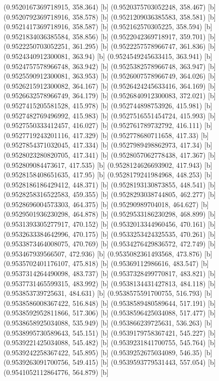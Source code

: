 {{{(0.9520167369718915, 358.364) [b] 
(0.9520375703052248, 358.467) [b] 
(0.9520792369718916, 358.578) [b] 
(0.9521209036385583, 358.581) [b] 
(0.9521417369718916, 358.587) [b] 
(0.952162570305225, 358.594) [b] 
(0.9521834036385584, 358.856) [b] 
(0.9522042369718917, 359.701) [b] 
(0.9522250703052251, 361.295) [b] 
(0.9522257578966747, 361.836) [b] 
(0.9524340912300081, 363.94) [b] 
(0.9524549245633415, 363.941) [b] 
(0.9524757578966748, 363.942) [b] 
(0.9525382578966748, 363.947) [b] 
(0.9525590912300081, 363.953) [b] 
(0.9526007578966749, 364.026) [b] 
(0.9526215912300082, 364.167) [b] 
(0.9526424245633416, 364.169) [b] 
(0.9526632578966749, 364.179) [b] 
(0.9526840912300083, 372.021) [b] 
(0.9527415205581528, 415.978) [b] 
(0.952744898753926, 415.981) [b] 
(0.9527482769496992, 415.983) [b] 
(0.9527516551454724, 415.993) [b] 
(0.9527550333412457, 416.027) [b] 
(0.952761789732792, 416.111) [b] 
(0.9527719243201116, 417.329) [b] 
(0.952778680711658, 417.33) [b] 
(0.9527854371032045, 417.334) [b] 
(0.9527989498862973, 417.34) [b] 
(0.9528023280820705, 417.341) [b] 
(0.9528057062778438, 417.367) [b] 
(0.952809084473617, 417.535) [b] 
(0.9528124626693902, 417.943) [b] 
(0.9528158408651635, 417.95) [b] 
(0.9528179241984968, 448.253) [b] 
(0.9528186186429412, 448.371) [b] 
(0.9528193130873855, 448.541) [b] 
(0.9528258316522583, 459.355) [b] 
(0.9528293038744805, 462.277) [b] 
(0.9528696004573303, 464.375) [b] 
(0.95290989704018, 464.627) [b] 
(0.9529501936230298, 464.878) [b] 
(0.9529533186230298, 468.899) [b] 
(0.9531393305277917, 470.152) [b] 
(0.9532013344960456, 470.161) [b] 
(0.9532633384642996, 470.175) [b] 
(0.9533253424325535, 470.261) [b] 
(0.9533873464008075, 470.769) [b] 
(0.9534276429836572, 472.749) [b] 
(0.953467939566507, 472.936) [b] 
(0.9535082361493568, 473.876) [b] 
(0.9535702401176107, 475.818) [b] 
(0.95369112986616, 483.547) [b] 
(0.9537314264490098, 483.737) [b] 
(0.9537328499770817, 483.821) [b] 
(0.9537731465599315, 483.992) [b] 
(0.9538134431427813, 484.118) [b] 
(0.953853739725631, 484.631) [b] 
(0.9538575591700755, 516.793) [b] 
(0.9538586008367422, 516.848) [b] 
(0.9538589480589644, 517.191) [b] 
(0.9538592952811866, 517.306) [b] 
(0.9538596425034088, 517.477) [b] 
(0.9538658925034088, 535.949) [b] 
(0.953866239725631, 536.263) [b] 
(0.9538995730589643, 545.151) [b] 
(0.9539179758367421, 545.227) [b] 
(0.9539221425034088, 545.482) [b] 
(0.9539231841700755, 545.764) [b] 
(0.9539242258367422, 545.895) [b] 
(0.9539252675034089, 546.35) [b] 
(0.9539263091700756, 549.415) [b] 
(0.9539593779531443, 557.054) [b] 
(0.9541052112864776, 564.879) [b] 
}}}
